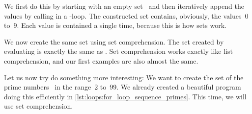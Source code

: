 We first do this by starting with an empty set~ and then iteratively append the values by calling  in a -loop.
The constructed set contains, obviously, the values~0 to~9.
Each value is contained a single time, because this is how sets work.%
%
\begin{sloppypar}%
We now create the same set using set comprehension.
The set  created by evaluating  is exactly the same as .
Set comprehension works exactly like list comprehension, and our first examples are also almost the same.%
\end{sloppypar}%
%
Let us now try do something more interesting:
We want to create the set  of the prime numbers~\cite{W2024PN,CP2005PNACP,R1994PNACMFF} in the range~2 to~99.
We already created a beautiful program doing this efficiently in \cref{lst:loops:for_loop_sequence_primes}.
This time, we will use set comprehension.


